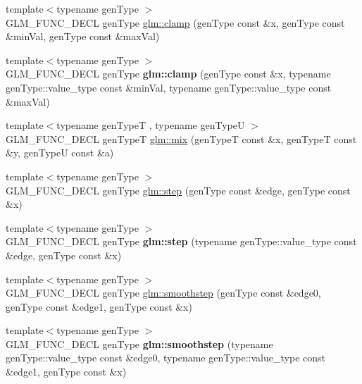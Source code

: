 \begin{DoxyCompactItemize}
\item 
{\footnotesize template$<$typename gen\+Type $>$ }\\G\+L\+M\+\_\+\+F\+U\+N\+C\+\_\+\+D\+E\+C\+L gen\+Type \hyperlink{group__core__func__common_ga72e9e213c84f06a329a2a838b51200f4}{glm\+::clamp} (gen\+Type const \&x, gen\+Type const \&min\+Val, gen\+Type const \&max\+Val)
\item 
\hypertarget{group__core__func__common_ga3f981a04dae72cd0b7a3e5a6524a69ea}{}{\footnotesize template$<$typename gen\+Type $>$ }\\G\+L\+M\+\_\+\+F\+U\+N\+C\+\_\+\+D\+E\+C\+L gen\+Type {\bfseries glm\+::clamp} (gen\+Type const \&x, typename gen\+Type\+::value\+\_\+type const \&min\+Val, typename gen\+Type\+::value\+\_\+type const \&max\+Val)\label{group__core__func__common_ga3f981a04dae72cd0b7a3e5a6524a69ea}

\item 
{\footnotesize template$<$typename gen\+Type\+T , typename gen\+Type\+U $>$ }\\G\+L\+M\+\_\+\+F\+U\+N\+C\+\_\+\+D\+E\+C\+L gen\+Type\+T \hyperlink{group__core__func__common_ga78aae7eea618ca112053d59fe03db239}{glm\+::mix} (gen\+Type\+T const \&x, gen\+Type\+T const \&y, gen\+Type\+U const \&a)
\item 
{\footnotesize template$<$typename gen\+Type $>$ }\\G\+L\+M\+\_\+\+F\+U\+N\+C\+\_\+\+D\+E\+C\+L gen\+Type \hyperlink{group__core__func__common_gaf21c84759af7799f573865f70c2f0a86}{glm\+::step} (gen\+Type const \&edge, gen\+Type const \&x)
\item 
\hypertarget{group__core__func__common_ga950e9734974f498d7f4380e2cb869a39}{}{\footnotesize template$<$typename gen\+Type $>$ }\\G\+L\+M\+\_\+\+F\+U\+N\+C\+\_\+\+D\+E\+C\+L gen\+Type {\bfseries glm\+::step} (typename gen\+Type\+::value\+\_\+type const \&edge, gen\+Type const \&x)\label{group__core__func__common_ga950e9734974f498d7f4380e2cb869a39}

\item 
{\footnotesize template$<$typename gen\+Type $>$ }\\G\+L\+M\+\_\+\+F\+U\+N\+C\+\_\+\+D\+E\+C\+L gen\+Type \hyperlink{group__core__func__common_ga754103c8d2cdaf40f71429252457c10a}{glm\+::smoothstep} (gen\+Type const \&edge0, gen\+Type const \&edge1, gen\+Type const \&x)
\item 
\hypertarget{group__core__func__common_ga1e7b9e668a0bd2f494a1d49b871a50ea}{}{\footnotesize template$<$typename gen\+Type $>$ }\\G\+L\+M\+\_\+\+F\+U\+N\+C\+\_\+\+D\+E\+C\+L gen\+Type {\bfseries glm\+::smoothstep} (typename gen\+Type\+::value\+\_\+type const \&edge0, typename gen\+Type\+::value\+\_\+type const \&edge1, gen\+Type const \&x)\label{group__core__func__common_ga1e7b9e668a0bd2f494a1d49b871a50ea}


\end{DoxyCompactItemize}
